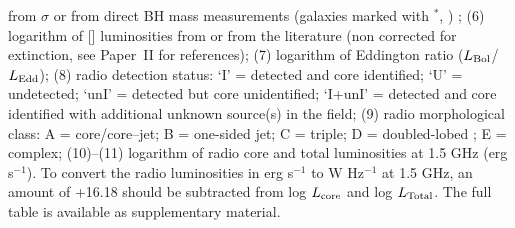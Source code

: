 \begin{table*}
\begin{flushleft}
from $\sigma$ \citep{tremaine02} or from direct BH mass measurements
(galaxies marked with $^{*}$, \citealt{vandenbosch16}) ; (6) logarithm of [] luminosities from \citet{ho97a} or from the literature (non corrected for extinction, see Paper~II for references); (7) logarithm of Eddington ratio ($L_{\rm Bol}$/$L_{\rm Edd}$); (8) radio detection
status: `I' = detected and core identified; `U' =
undetected; `unI' = detected but core unidentified; `I+unI' =  detected and core identified with additional unknown source(s) in the field; (9) radio
morphological class: A = core/core--jet; B = one-sided jet; C =
triple; D = doubled-lobed ; E = complex; (10)--(11) logarithm of radio core and total luminosities at 1.5 GHz (erg s$^{-1}$).  To convert the radio luminosities in erg s$^{-1}$ to W Hz$^{-1}$ at 1.5 GHz, an amount of +16.18 should be subtracted from log $L_{\rm core}$ and log $L_{\rm Total}$. The full table is available as supplementary material.
\end{flushleft}
\end{table*}

